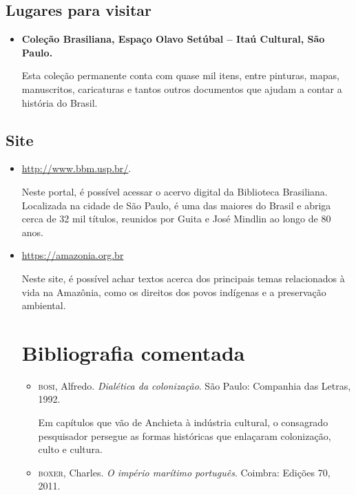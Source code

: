 \documentclass[12pt]{extarticle}
\begin{document}
{\begin{itemize}
	\end{itemize}

\subsection{Lugares para visitar}

\begin{itemize}
\item\textbf{Coleção Brasiliana, Espaço Olavo Setúbal -- Itaú Cultural, São Paulo.}

Esta coleção permanente conta com quase mil itens, entre pinturas,
mapas, manuscritos, caricaturas e tantos outros documentos que ajudam a
contar a história do Brasil.
\end{itemize}

\subsection{Site}

\begin{itemize}
\item\url{http://www.bbm.usp.br/}.

Neste portal, é possível acessar o acervo digital da Biblioteca
Brasiliana. Localizada na cidade de São Paulo, é uma das maiores do
Brasil e abriga cerca de 32 mil títulos, reunidos por Guita e José
Mindlin ao longo de 80 anos.

 \item\url{https://amazonia.org.br}

 Neste site, é possível achar textos acerca dos principais temas 
 relacionados à vida na Amazônia, como os direitos dos povos indígenas e
 a preservação ambiental.

\section{Bibliografia comentada}

\begin{itemize}
\item\textsc{bosi}, Alfredo. \textit{Dialética da colonização}. São Paulo: Companhia
das Letras, 1992.

Em capítulos que vão de Anchieta à indústria cultural, o consagrado
pesquisador persegue as formas históricas que enlaçaram colonização,
culto e cultura.

\item\textsc{boxer}, Charles. \textit{O império marítimo português}. Coimbra: Edições 70, 2011.


\end{itemize}
\end{itemize}}
\end{document}
